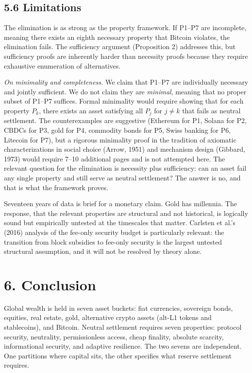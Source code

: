 \documentclass[12pt]{article}
\theoremstyle{definition}
\theoremstyle{remark}
\begin{document}
\subsection{5.6 Limitations}

The elimination is as strong as the property framework. If P1--P7 are
incomplete, meaning there exists an eighth necessary property that
Bitcoin violates, the elimination fails. The sufficiency argument
(Proposition 2) addresses this, but sufficiency proofs are inherently
harder than necessity proofs because they require exhaustive
enumeration of alternatives.

\noindent\emph{On minimality and completeness.} We claim that P1--P7
are individually necessary and jointly sufficient. We do not claim
they are \emph{minimal}, meaning that no proper subset of P1--P7
suffices. Formal minimality would require showing that for each
property $P_k$, there exists an asset satisfying all $P_j$ for $j \neq
k$ that fails as neutral settlement. The counterexamples are suggestive
(Ethereum for P1, Solana for P2, CBDCs for P3, gold for P4, commodity
bonds for P5, Swiss banking for P6, Litecoin for P7), but a rigorous
minimality proof in the tradition of axiomatic characterizations in
social choice (Arrow, 1951) and mechanism design (Gibbard, 1973) would
require 7--10 additional pages and is not attempted here. The relevant
question for the elimination is necessity plus sufficiency: can an
asset fail any single property and still serve as neutral settlement?
The answer is no, and that is what the framework proves.

Seventeen years of data is brief for a monetary claim. Gold has
millennia. The response, that the relevant properties are structural
and not historical, is logically sound but empirically untested at the
timescales that matter. Carlsten et al.'s (2016) analysis of the
fee-only security budget is particularly relevant: the transition from
block subsidies to fee-only security is the largest untested structural
assumption, and it will not be resolved by theory alone.
\section{6. Conclusion}

Global wealth is held in seven asset buckets: fiat currencies,
sovereign bonds, equities, real estate, gold, alternative crypto assets
(alt-L1 tokens and stablecoins), and Bitcoin. Neutral settlement
requires seven properties: protocol security, neutrality, permissionless
access, cheap finality, absolute scarcity, informational security, and
adaptive resilience. The two sevens are independent. One partitions
where capital sits, the other specifies what reserve settlement
requires.
\end{document}

